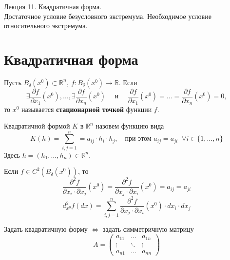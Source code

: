 \documentclass[11pt]{article}
\begin{document}
\begin{titlepage}
    \centering
    \vspace*{\fill}  %

    {\Huge Лекция 11. Квадратичная форма. \\ Достаточное условие безусловного 
    экстремума. Необходимое условие относительного экстремума.
    \par}

    \vspace*{\fill}  %
\end{titlepage}

\setcounter{page}{1}

\section{Квадратичная форма}

\begin{definition}
    Пусть $B_\delta(x^0) \subset \mathbb{R}^n, \ f \colon B_\delta(x^0) \to \mathbb{R}$.
    Если \[\exists \frac{\partial f}{\partial x_1}(x^0), \ldots, \exists \frac{\partial f}{\partial x_n}(x^0) \quad \text{ и } \quad \frac{\partial f}{\partial x_1}(x^0) = \ldots = \frac{\partial f}{\partial x_n}(x^0) = 0,\]
    то $x^0$ называется \textbf{стационарной точкой} функции $f$.
\end{definition}

\begin{definition}
    Квадратичной формой $K$ в $\mathbb{R}^n$ назовем функцию вида 
    \[K(h) = \sum_{i, j = 1}^n = a_{ij} \cdot h_i \cdot h_j, \quad \text{при этом }
    a_{ij} = a_{ji} \; \; \forall i \in \{1, \dots, n\}\]
    Здесь $h = (h_1, \ldots, h_n) \in \mathbb{R}^n$.
\end{definition}

\begin{example}
    Если $f \in C^2(B_\delta(x^0))$, то \[\frac{\partial^2 f}{\partial x_i \cdot 
    \partial x_j}(x^0) = \frac{\partial^2 f}{\partial x_j \cdot \partial x_i}(x^0)
    = a_{ij} = a_{ji}\]
    \[d^2_{x^0}f(dx) = \sum_{i, j = 1}^n \frac{\partial^2 f}{\partial x_j \cdot \partial x_i} (x^0) \cdot dx_i \cdot dx_j\]
\end{example}

\begin{remark}
    Задать квадратичную форму $\Longleftrightarrow$ задать симметричную матрицу
    \[ A =
    \begin{pmatrix}
        a_{11}  & \dots & a_{1n} \\ \vdots & \ddots & \vdots \\ a_{n1} & \dots & a_{nn}
    \end{pmatrix}
    \]
\end{remark}
\end{document}
